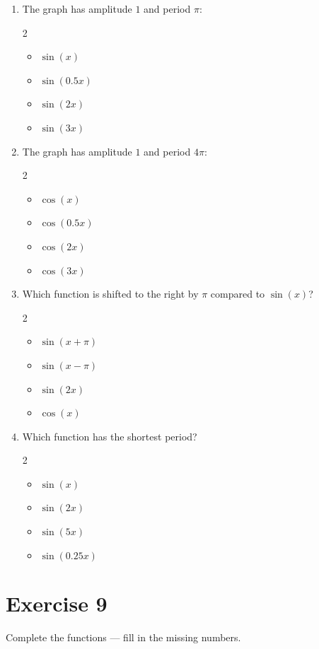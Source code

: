 \documentclass[11pt,a4paper]{article}
\begin{document}
\begin{enumerate}
\item The graph has amplitude $1$ and period $\pi$:
\begin{multicols}{2}
\begin{itemize}[label=$\square$]
\item $\sin(x)$
\item $\sin(0.5x)$
\item $\sin(2x)$
\item $\sin(3x)$
\end{itemize}
\end{multicols}

\item The graph has amplitude $1$ and period $4\pi$:
\begin{multicols}{2}
\begin{itemize}[label=$\square$]
\item $\cos(x)$
\item $\cos(0.5x)$
\item $\cos(2x)$
\item $\cos(3x)$
\end{itemize}
\end{multicols}

\item Which function is shifted to the right by $\pi$ compared to $\sin(x)$?
\begin{multicols}{2}
\begin{itemize}[label=$\square$]
\item $\sin(x+\pi)$
\item $\sin(x-\pi)$
\item $\sin(2x)$
\item $\cos(x)$
\end{itemize}
\end{multicols}

\item Which function has the shortest period?
\begin{multicols}{2}
\begin{itemize}[label=$\square$]
\item $\sin(x)$
\item $\sin(2x)$
\item $\sin(5x)$
\item $\sin(0.25x)$
\end{itemize}
\end{multicols}
\end{enumerate}

\section*{Exercise 9}
Complete the functions --- fill in the missing numbers.
\end{document}
